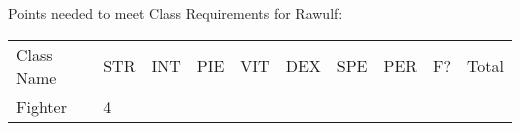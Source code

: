 \documentclass[12pt]{article}
\newcommand{\indexRace}[1]{\index{#1}}
\newcommand{\race}[1]{#1\indexRace{#1}}
\newcommand{\indexClass}[1]{\index{#1}}
\newcommand{\class}[1]{#1\indexClass{#1}}
\begin{document}
Points needed to meet Class Requirements for \race{Rawulf}:

\begin{longtable}[]{@{}llllllllll@{}}
\toprule
\begin{minipage}[t]{0.13\columnwidth}\raggedright\strut
Class Name
\strut\end{minipage} &
\begin{minipage}[t]{0.06\columnwidth}\raggedright\strut
STR
\strut\end{minipage} &
\begin{minipage}[t]{0.06\columnwidth}\raggedright\strut
INT
\strut\end{minipage} &
\begin{minipage}[t]{0.06\columnwidth}\raggedright\strut
PIE
\strut\end{minipage} &
\begin{minipage}[t]{0.06\columnwidth}\raggedright\strut
VIT
\strut\end{minipage} &
\begin{minipage}[t]{0.06\columnwidth}\raggedright\strut
DEX
\strut\end{minipage} &
\begin{minipage}[t]{0.06\columnwidth}\raggedright\strut
SPE
\strut\end{minipage} &
\begin{minipage}[t]{0.06\columnwidth}\raggedright\strut
PER
\strut\end{minipage} &
\begin{minipage}[t]{0.07\columnwidth}\raggedright\strut
F?
\strut\end{minipage} &
\begin{minipage}[t]{0.08\columnwidth}\raggedright\strut
Total
\strut\end{minipage}\tabularnewline
\begin{minipage}[t]{0.13\columnwidth}\raggedright\strut
\class{Fighter}
\strut\end{minipage} &
\begin{minipage}[t]{0.06\columnwidth}\raggedright\strut
4
\strut\end{minipage} &
\begin{minipage}[t]{0.06\columnwidth}\raggedright\strut
\strut\end{minipage} &
\begin{minipage}[t]{0.06\columnwidth}\raggedright\strut
\strut\end{minipage} &
\begin{minipage}[t]{0.06\columnwidth}\raggedright\strut
\strut\end{minipage} &

\end{longtable}
\end{document}
